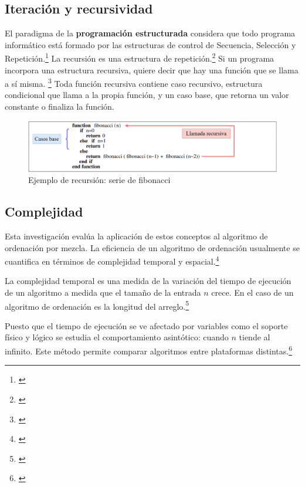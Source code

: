 \documentclass[titlepage]{article}
\begin{document}
\subsection{Iteración y recursividad} %
El paradigma de la \textbf{programación estructurada} considera que todo programa informático está formado por las estructuras de control de Secuencia, Selección y Repetición.\footnote{\cite{extended-learning-institute-no-date}} La recursión es una estructura de repetición.\footnote{\cite{wellesley-college-2000}} Si un programa incorpora una estructura recursiva, quiere decir que hay una función que se llama a sí misma. \footnote{\cite{bhargava-2016}} Toda función recursiva contiene caso recursivo, estructura condicional que llama a la propia función, y un caso base,  que retorna un valor constante o finaliza la función.
\begin{figure}[h]
	\includegraphics[width=\textwidth]{ejemploRecursion.png}
	
	\label{fig:ejemploRecursion}
\caption{Ejemplo de recursión: serie de fibonacci}

\end{figure}


\subsection{Complejidad} %
Esta investigación evalúa la aplicación de estos conceptos al algoritmo de ordenación por mezcla. La eficiencia de un algoritmo de ordenación usualmente se cuantifica en términos de complejidad temporal y espacial.\footnote{\cite{molluzzo1997first}}

La complejidad temporal es una medida de la variación del tiempo de ejecución de un algoritmo a medida que el tamaño de la entrada $n$ crece. En el caso de un algoritmo de ordenación es la longitud del arreglo.\footnote{\cite{ching2023uncertainty}}

Puesto que el tiempo de ejecución se ve afectado por variables como el soporte físico y lógico se estudia el comportamiento asintótico: cuando $n$ tiende al infinito. Este método permite comparar algoritmos entre plataformas distintas.\footnote{\cite{Heineman2008-mw}}
\end{document}

